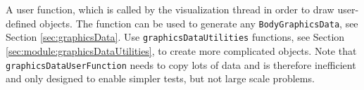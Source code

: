     \finishTable
    \vspace{12pt}
    A user function, which is called by the visualization thread in order to draw user-defined objects.
    The function can be used to generate any \texttt{BodyGraphicsData}, see Section \ref{sec:graphicsData}.
    Use \texttt{graphicsDataUtilities} functions, see Section \ref{sec:module:graphicsDataUtilities}, to create more complicated objects. 
    Note that \texttt{graphicsDataUserFunction} needs to copy lots of data and is therefore
    inefficient and only designed to enable simpler tests, but not large scale problems.

